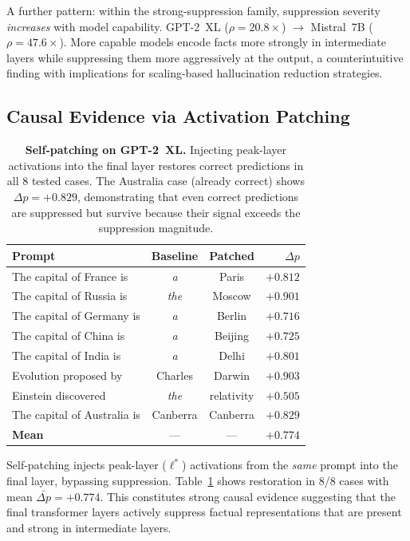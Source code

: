 \documentclass{article}
\begin{document}
A further pattern: within the strong-suppression family, suppression
severity \emph{increases} with model capability.
GPT-2~XL ($\rho=20.8\times$) $\to$ Mistral~7B ($\rho=47.6\times$).
More capable models encode facts more strongly in intermediate layers
while suppressing them more aggressively at the output, a counterintuitive
finding with implications for scaling-based hallucination reduction strategies.

\subsection{Causal Evidence via Activation Patching}

\begin{table}[htbp]
\caption{\textbf{Self-patching on GPT-2~XL.} Injecting peak-layer
activations into the final layer restores correct predictions in all
8 tested cases. The Australia case (already correct) shows
$\Delta p=+0.829$, demonstrating that even correct predictions are
suppressed but survive because their signal exceeds the suppression
magnitude.}
\label{tab:patching}
\centering\small
\begin{tabular}{lccr}
\toprule
\textbf{Prompt} & \textbf{Baseline} & \textbf{Patched} & $\Delta p$ \\
\midrule
The capital of France is     & \textit{a}   & Paris      & $+0.812$ \\
The capital of Russia is     & \textit{the} & Moscow     & $+0.901$ \\
The capital of Germany is    & \textit{a}   & Berlin     & $+0.716$ \\
The capital of China is      & \textit{a}   & Beijing    & $+0.725$ \\
The capital of India is      & \textit{a}   & Delhi      & $+0.801$ \\
Evolution proposed by        & Charles      & Darwin     & $+0.903$ \\
Einstein discovered          & \textit{the} & relativity & $+0.505$ \\
The capital of Australia is  & Canberra     & Canberra   & $+0.829$ \\
\midrule
\textbf{Mean}               & ---          & ---        & $\mathbf{+0.774}$ \\
\bottomrule
\end{tabular}
\end{table}

Self-patching injects peak-layer ($\ell^*$) activations from the \emph{same}
prompt into the final layer, bypassing suppression.
Table~\ref{tab:patching} shows restoration in 8/8 cases with mean
$\bar{\Delta p}=+0.774$.
This constitutes strong causal evidence suggesting that the final
transformer layers actively suppress factual representations that are
present and strong in intermediate layers.
\end{document}
